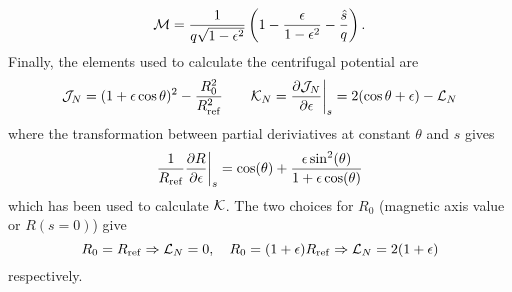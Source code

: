 \begin{equation}
 {\cal M} = {1 \over q \sqrt{1-\epsilon^2}}\left(1-{\epsilon \over 1-\epsilon^2}-{\hat s \over q}\right).
\end{equation}
Finally, the elements used to calculate the centrifugal potential are 
\begin{equation}
 \mathcal{J}_N= (1+\epsilon\cos\theta)^2-\frac{R_0^2}{R_{\mathrm{ref}}^2} \qquad \mathcal{K}_N=\frac{\partial \mathcal{J}_N}{\partial 
\epsilon} \biggr |_s =2(\cos\theta+\epsilon)-{\cal L}_N
\end{equation}
where the transformation between partial deriviatives at constant $\theta$ and $s$ gives
\begin{equation}
\frac{1}{R_{\mathrm{ref}}} \frac{\partial R}{\partial \epsilon} \biggr |_s= \cos(\theta) + \frac{\epsilon \sin^2(\theta)}{1+\epsilon \cos(\theta)}
\end{equation}
which has been used to calculate ${\cal K}$.
The two choices for $R_0$ (magnetic axis value or $R(s=0)$) give
\begin{equation}
R_0=R_{\mathrm{ref}} \Rightarrow {\cal L}_N=0, \quad  
R_0=(1+\epsilon)R_{\mathrm{ref}} \Rightarrow {\cal L}_N =2(1+\epsilon)
\end{equation}
respectively.

